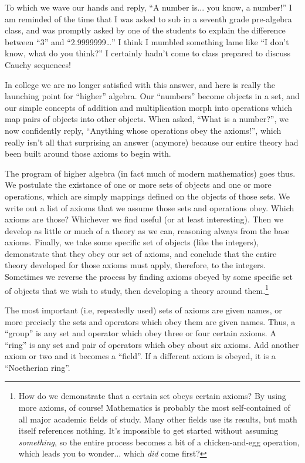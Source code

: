 To which we wave our hands and reply, ``A number is... you know, a number!''
I am reminded of the time that I was asked to sub in a
seventh grade pre-algebra class, and was promptly asked by one of the
students to explain the difference between ``3'' and ``2.9999999\ldots''
I think I mumbled something lame like ``I don't know, what do you
think?'' I certainly hadn't come to class prepared to discuss Cauchy
sequences!

In college we are no longer satisfied with this answer, and here is
really the launching point for ``higher'' algebra.  Our ``numbers''
become objects in a set, and our simple concepts of addition and
multiplication morph into operations which map pairs of objects into
other objects.  When asked, ``What is a number?'', we now confidently
reply, ``Anything whose operations obey the axioms!'', which really
isn't all that surprising an answer (anymore) because our entire
theory had been built around those axioms to begin with.

The program of higher algebra (in fact much of modern mathematics)
goes thus.  We postulate the existance of one or more sets of objects
and one or more operations, which are simply mappings defined on the
objects of those sets.  We write out a list of axioms that we assume
those sets and operations obey.  Which axioms are those?  Whichever we
find useful (or at least interesting).  Then we develop as little or
much of a theory as we can, reasoning always from the base axioms.
Finally, we take some specific set of objects (like the integers),
demonstrate that they obey our set of axioms, and conclude that the
entire theory developed for those axioms must apply, therefore, to the
integers.  Sometimes we reverse the process by finding axioms obeyed
by some specific set of objects that we wish to study, then developing
a theory around them.\footnote{How do we demonstrate that a certain
set obeys certain axioms?  By using more axioms, of course!
Mathematics is probably the most self-contained of all major academic
fields of study.  Many other fields use its results, but math itself
references nothing.  It's impossible to get started without assuming
{\it something}, so the entire process becomes a bit of a
chicken-and-egg operation, which leads you to wonder$...$ which {\it
did} come first?}

The most important (i.e, repeatedly used) sets of axioms are given
names, or more precisely the sets and operators which obey them are
given names.  Thus, a ``group'' is any set and operator which obey three
or four certain axioms.  A ``ring'' is any set and pair of operators
which obey about six axioms.  Add another axiom or two and it
becomes a ``field''.  If a different axiom is obeyed, it is a
``Noetherian ring''.

